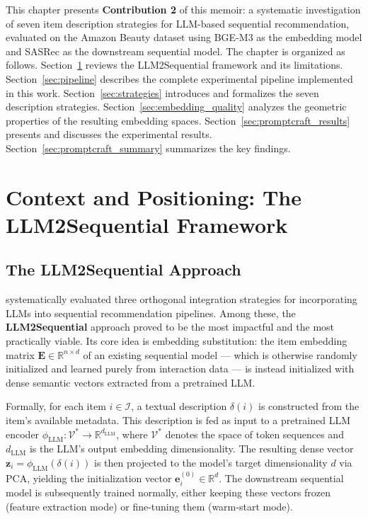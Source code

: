 \documentclass[12pt,a4paper]{report}
\newcommand{\textcite}[1]{\citet{#1}}
\begin{document}
This chapter presents \textbf{Contribution 2} of this memoir: a
systematic investigation of seven item description strategies for
LLM-based sequential recommendation, evaluated on the Amazon Beauty
dataset using BGE-M3 as the embedding model and SASRec as the
downstream sequential model. The chapter is organized as follows.
Section~\ref{sec:context} reviews the LLM2Sequential framework and
its limitations. Section~\ref{sec:pipeline} describes the complete
experimental pipeline implemented in this work. Section~\ref{sec:strategies}
introduces and formalizes the seven description strategies.
Section~\ref{sec:embedding_quality} analyzes the geometric properties
of the resulting embedding spaces. Section~\ref{sec:promptcraft_results}
presents and discusses the experimental results. Section~\ref{sec:promptcraft_summary}
summarizes the key findings.


\section{Context and Positioning: The LLM2Sequential Framework}
\label{sec:context}

\subsection{The LLM2Sequential Approach}

\textcite{boz2025improving} systematically evaluated three
orthogonal integration strategies for incorporating LLMs into
sequential recommendation pipelines. Among these, the
\textbf{LLM2Sequential} approach proved to be the most impactful
and the most practically viable. Its core idea is embedding
substitution: the item embedding matrix $\mathbf{E} \in
\mathbb{R}^{n \times d}$ of an existing sequential model
--- which is otherwise randomly initialized and learned
purely from interaction data --- is instead initialized with
dense semantic vectors extracted from a pretrained LLM.

Formally, for each item $i \in \mathcal{I}$, a textual description
$\delta(i)$ is constructed from the item's available metadata.
This description is fed as input to a pretrained LLM encoder
$\phi_{\text{LLM}} : \mathcal{V}^* \rightarrow \mathbb{R}^{d_{\text{LLM}}}$,
where $\mathcal{V}^*$ denotes the space of token sequences and
$d_{\text{LLM}}$ is the LLM's output embedding dimensionality.
The resulting dense vector $\mathbf{z}_i = \phi_{\text{LLM}}(\delta(i))$
is then projected to the model's target dimensionality $d$ via PCA,
yielding the initialization vector $\mathbf{e}_i^{(0)}
\in \mathbb{R}^d$. The downstream sequential model is subsequently
trained normally, either keeping these vectors frozen (feature
extraction mode) or fine-tuning them (warm-start mode).
\end{document}
